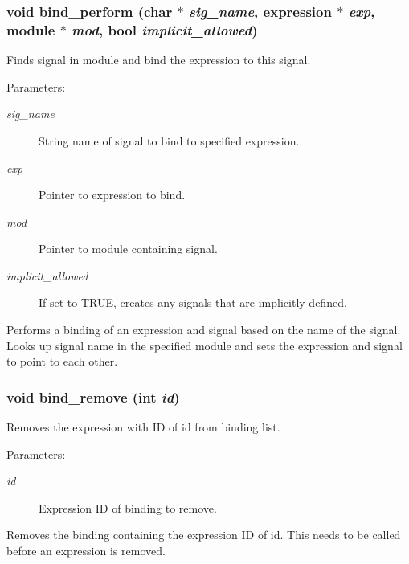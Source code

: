 \subsubsection{\setlength{\rightskip}{0pt plus 5cm}void bind\_\-perform (char $\ast$ {\em sig\_\-name}, {\bf expression} $\ast$ {\em exp}, {\bf module} $\ast$ {\em mod}, {\bf bool} {\em implicit\_\-allowed})}\label{binding_8h_a2}


Finds signal in module and bind the expression to this signal.

\begin{Desc}
\item[Parameters: ]\par
\begin{description}
\item[{\em 
sig\_\-name}]String name of signal to bind to specified expression. \item[{\em 
exp}]Pointer to expression to bind. \item[{\em 
mod}]Pointer to module containing signal. \item[{\em 
implicit\_\-allowed}]If set to TRUE, creates any signals that are implicitly defined.\end{description}
\end{Desc}
Performs a binding of an expression and signal based on the name of the signal. Looks up signal name in the specified module and sets the expression and signal to point to each other. 
\subsubsection{\setlength{\rightskip}{0pt plus 5cm}void bind\_\-remove (int {\em id})}\label{binding_8h_a1}


Removes the expression with ID of id from binding list.

\begin{Desc}
\item[Parameters: ]\par
\begin{description}
\item[{\em 
id}]Expression ID of binding to remove.\end{description}
\end{Desc}
Removes the binding containing the expression ID of id. This needs to be called before an expression is removed. 